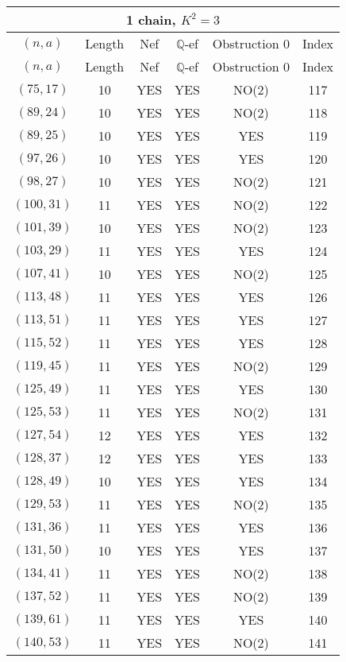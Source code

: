 \begin{longtable}{|c|c|c|c|c|c|}
\hline
\multicolumn{6}{|c|}{1 chain, $K^2 = 3$}\\
\hline
$(n,a)$ & Length & Nef & $\mathbb Q$-ef & Obstruction 0 & Index\\
\hline
\endfirsthead

\hline
$(n,a)$ & Length & Nef & $\mathbb Q$-ef & Obstruction 0 & Index\\
\hline
\endhead
\hline
\endfoot

$(75, 17)$ & 10 & YES & YES & NO(2) & 117\\
$(89, 24)$ & 10 & YES & YES & NO(2) & 118\\
$(89, 25)$ & 10 & YES & YES & YES & 119\\
$(97, 26)$ & 10 & YES & YES & YES & 120\\
$(98, 27)$ & 10 & YES & YES & NO(2) & 121\\
$(100, 31)$ & 11 & YES & YES & NO(2) & 122\\
$(101, 39)$ & 10 & YES & YES & NO(2) & 123\\
$(103, 29)$ & 11 & YES & YES & YES & 124\\
$(107, 41)$ & 10 & YES & YES & NO(2) & 125\\
$(113, 48)$ & 11 & YES & YES & YES & 126\\
$(113, 51)$ & 11 & YES & YES & YES & 127\\
$(115, 52)$ & 11 & YES & YES & YES & 128\\
$(119, 45)$ & 11 & YES & YES & NO(2) & 129\\
$(125, 49)$ & 11 & YES & YES & YES & 130\\
$(125, 53)$ & 11 & YES & YES & NO(2) & 131\\
$(127, 54)$ & 12 & YES & YES & YES & 132\\
$(128, 37)$ & 12 & YES & YES & YES & 133\\
$(128, 49)$ & 10 & YES & YES & YES & 134\\
$(129, 53)$ & 11 & YES & YES & NO(2) & 135\\
$(131, 36)$ & 11 & YES & YES & YES & 136\\
$(131, 50)$ & 10 & YES & YES & YES & 137\\
$(134, 41)$ & 11 & YES & YES & NO(2) & 138\\
$(137, 52)$ & 11 & YES & YES & NO(2) & 139\\
$(139, 61)$ & 11 & YES & YES & YES & 140\\
$(140, 53)$ & 11 & YES & YES & NO(2) & 141\\

\end{longtable}
